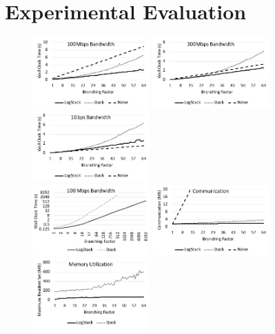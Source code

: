 \section{Experimental Evaluation}\label{sec:eval}

\begin{figure}[t]
  \begin{adjustwidth}{-0.13\textwidth}{-0.13\textwidth}
  	\centering
    \includegraphics[width=0.4\textwidth]{fig/100mbps}
    \includegraphics[width=0.4\textwidth]{fig/300mbps}
    \includegraphics[width=0.4\textwidth]{fig/1gbps}
  	\\
    \includegraphics[width=0.4\textwidth]{fig/highbranching}
    \includegraphics[width=0.4\textwidth]{fig/comm}
    \includegraphics[width=0.4\textwidth]{fig/memutil}
  \end{adjustwidth}
  \caption{%
  }\label{fig:plots}
\end{figure}

